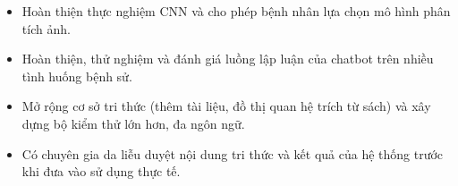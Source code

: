 \begin{itemize}
  \item Hoàn thiện thực nghiệm CNN và cho phép bệnh nhân lựa chọn mô hình phân tích ảnh.
  \item Hoàn thiện, thử nghiệm và đánh giá luồng lập luận của chatbot trên nhiều tình huống bệnh sử.
  \item Mở rộng cơ sở tri thức (thêm tài liệu, đồ thị quan hệ trích từ sách) và xây dựng bộ kiểm thử lớn hơn, đa ngôn ngữ.
  \item Có chuyên gia da liễu duyệt nội dung tri thức và kết quả của hệ thống trước khi đưa vào sử dụng thực tế.
\end{itemize}
